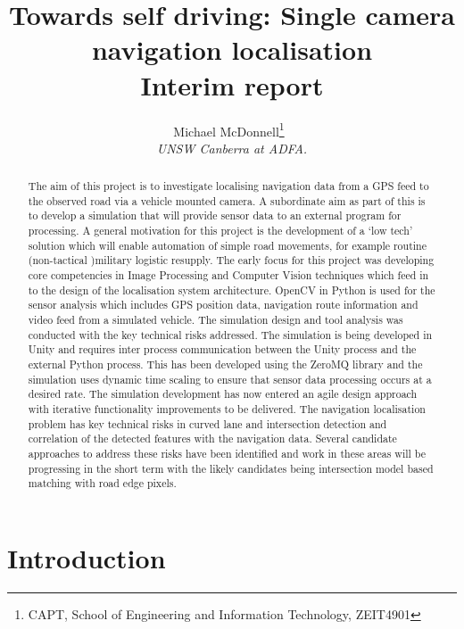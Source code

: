\documentclass[]{aiaa-tc}%
\title{Towards self driving: Single camera navigation localisation\\ Interim report}
\author{
  Michael McDonnell\thanks{CAPT, School of Engineering and Information Technology, ZEIT4901}\
  \\
  {\normalsize\itshape
   UNSW Canberra at ADFA.}\\
  }
\begin{document}
\maketitle


\begin{abstract}
The aim of this project is to investigate localising navigation data from a GPS feed to the observed road via a vehicle mounted camera. A subordinate aim as part of this is to develop a simulation that will provide sensor data to an external program for processing. A general motivation for this project is the development of a `low tech' solution which will enable automation of simple road movements, for example routine (non-tactical )military logistic resupply. 
The early focus for this project was developing core competencies in Image Processing and Computer Vision techniques which feed in to the design of the localisation system architecture. OpenCV in Python is used for the sensor analysis which includes GPS position data, navigation route information and video feed from a simulated vehicle.
The simulation design and tool analysis was conducted with the key technical risks addressed. The simulation is being developed in Unity and requires inter process communication between the Unity process and the external Python process. This has been developed using the ZeroMQ library and the simulation uses dynamic time scaling to ensure that sensor data processing occurs at a desired rate. The simulation development has now entered an agile design approach with iterative functionality improvements to be delivered.
The navigation localisation problem has key technical risks in curved lane and intersection detection and correlation of the detected features with the navigation data. Several candidate approaches to address these risks have been identified and work in these areas will be progressing in the short term with the likely candidates being intersection model based matching with road edge pixels.
\end{abstract}

\newpage
\tableofcontents

\newpage
\section{Introduction} \label{sect:intro}
 
\end{document}

